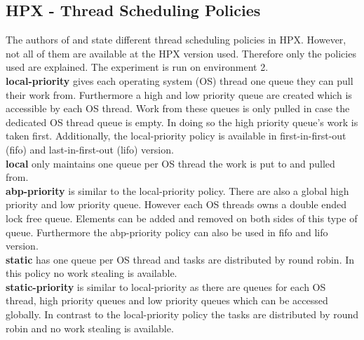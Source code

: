 \subsection{HPX - Thread Scheduling Policies}
 The authors of \cite{hpxMP.2019} and \cite{TheSTEARGroup.2020} state different thread scheduling policies in HPX.
 However, not all of them are available at the HPX version used.
 Therefore only the policies used are explained.
 The experiment is run on environment 2.\\
 \textbf{local-priority} gives each operating system (OS) thread one queue they can pull their work from.
 Furthermore a high and low priority queue are created which is accessible by each OS thread.
 Work from these queues is only pulled in case the dedicated OS thread queue is empty.
 In doing so the high priority queue's work is taken first.
 Additionally, the local-priority policy is available in first-in-first-out (fifo) and last-in-first-out (lifo) version.\\
 \textbf{local} only maintains one queue per OS thread the work is put to and pulled from.\\
 \textbf{abp-priority} is similar to the local-priority policy.
 There are also a global high priority and low priority queue.
 However each OS threads owns a double ended lock free queue.
 Elements can be added and removed on both sides of this type of queue.
 Furthermore the abp-priority policy can also be used in fifo and lifo version.\\
 \textbf{static} has one queue per OS thread and tasks are distributed by round robin.
 In this policy no work stealing is available.\\
 \textbf{static-priority} is similar to local-priority as there are queues for each OS thread, high priority queues and low priority queues which can be accessed globally.
 In contrast to the local-priority policy the tasks are distributed by round robin and no work stealing is available.

